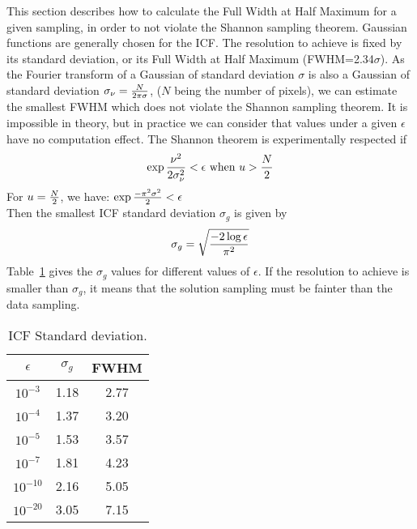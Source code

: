 This section describes how to calculate the Full Width at Half 
Maximum for a given sampling, in order to not violate the Shannon
sampling theorem. Gaussian functions are generally chosen for the ICF. 
The resolution to
achieve is fixed by its standard deviation, or its Full Width at Half 
Maximum (FWHM=2.34$\sigma$). As the Fourier transform of a Gaussian 
of standard deviation $\sigma$ is
also a Gaussian of standard deviation $\sigma_\nu = {N \over 2\pi \sigma}$,
($N$ being the number of pixels), we can estimate the smallest FWHM which 
does not violate the Shannon sampling theorem. It is impossible in theory,  
but in practice we can consider that values under a given $\epsilon$ have
no computation effect. The Shannon theorem is experimentally
respected if 
\begin{eqnarray}
\exp{ {\nu^2 \over 2 \sigma_{\nu}^2}} < \epsilon \mbox{ when } u > {N \over 2}
\end{eqnarray}
For $u = {N \over 2}$, we have:
$
\exp{ -\pi^2\sigma^2 \over 2 } < \epsilon
$ \\
Then the smallest ICF standard deviation $\sigma_{g}$ is given by
\begin{eqnarray}
\sigma_g = \sqrt{-2 \log{\epsilon} \over \pi^2}
\end{eqnarray}
Table~\ref{sigmag} gives the $\sigma_g$ values for different values
of $\epsilon$. If the resolution to achieve is smaller than $\sigma_g$,
it means that the solution sampling must be fainter than the data sampling.

\begin{table}[hbt]
\caption{ICF Standard deviation.}
\begin{center}
\begin{tabular}{ccc} \hline \hline
$\epsilon$     & $\sigma_g$  & FWHM       \\ \hline \hline
 $10^{-3}$      & 1.18    &   2.77     \\
$10^{-4} $       & 1.37    &   3.20     \\
$10^{-5} $       & 1.53    &   3.57     \\
$10^{-7} $       & 1.81    &   4.23     \\
$10^{-10}$      & 2.16    &   5.05     \\
$10^{-20}$      & 3.05    &   7.15     \\  \hline \hline
\end{tabular}
\end{center}
\label{sigmag}
\end{table}


 



